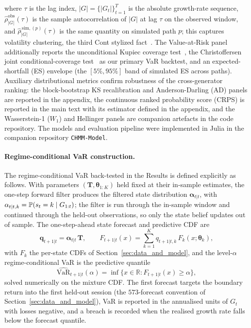 where $\tau$ is the lag index, $|G| = \{|G_t|\}_{t=1}^T$ is the absolute growth-rate sequence, $\hat\rho^{\text{obs}}_{|G|}(\tau)$ is the sample autocorrelation of $|G|$ at lag $\tau$ on the observed window, and $\hat\rho^{\,\text{sim},(p)}_{|G|}(\tau)$ is the same quantity on simulated path $p$; this captures volatility clustering, the third Cont stylized fact~\cite{cont2001empirical}. The Value-at-Risk panel additionally reports the unconditional Kupiec coverage test~\cite{kupiec1995techniques}, the Christoffersen joint conditional-coverage test~\cite{christoffersen1998evaluating} as our primary VaR backtest, and an expected-shortfall (ES) envelope (the $[5\%, 95\%]$ band of simulated ES across paths). Auxiliary distributional metrics confirm robustness of the cross-generator ranking: the block-bootstrap KS recalibration and Anderson-Darling (AD) panels are reported in the appendix, the continuous ranked probability score (CRPS) is reported in the main text with its estimator defined in the appendix, and the Wasserstein-1 ($W_1$) and Hellinger panels are companion artefacts in the code repository. The models and evaluation pipeline were implemented in Julia in the companion repository \texttt{CHMM-Model}.

\paragraph{Regime-conditional VaR construction.}
The regime-conditional VaR back-tested in the Results is defined explicitly as follows. With parameters $(\mathbf T, \boldsymbol\theta_{1:K})$ held fixed at their in-sample estimates, the one-step forward filter produces the filtered state distribution $\boldsymbol\alpha_{t|t}$, with $\alpha_{t|t,k} = \mathbb{P}(s_t = k \mid G_{1:t})$; the filter is run through the in-sample window and continued through the held-out observations, so only the state belief updates out of sample. The one-step-ahead state forecast and predictive CDF are
\begin{equation}
    \mathbf q_{t+1|t} = \boldsymbol\alpha_{t|t}\,\mathbf T,
    \qquad
    F_{t+1|t}(x) = \sum_{k=1}^{K} q_{t+1|t,k}\, F_k(x; \boldsymbol\theta_k),
    \label{eq:predictive_mixture}
\end{equation}
with $F_k$ the per-state CDFs of Section~\ref{sec:data_and_model}, and the level-$\alpha$ regime-conditional VaR is the predictive quantile
\begin{equation}
    \widehat{\mathrm{VaR}}_{t+1|t}(\alpha) = \inf\{x \in \mathbb{R} : F_{t+1|t}(x) \ge \alpha\},
    \label{eq:var_quantile}
\end{equation}
solved numerically on the mixture CDF. The first forecast targets the boundary return into the first held-out session (the $573$-forecast convention of Section~\ref{sec:data_and_model}), VaR is reported in the annualised units of $G_t$ with losses negative, and a breach is recorded when the realised growth rate falls below the forecast quantile.
